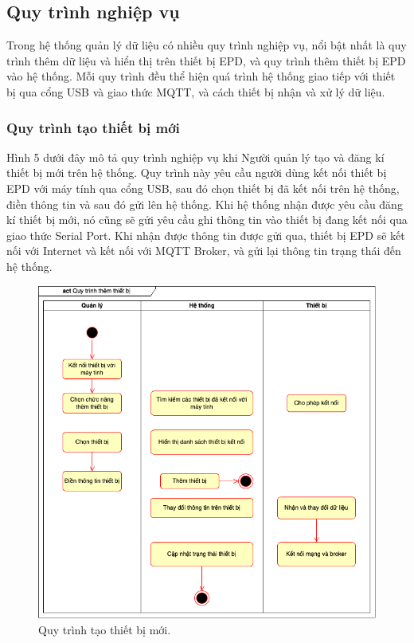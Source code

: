 \documentclass[../DoAn.tex]{subfiles}
\begin{document}
\subsection{Quy trình nghiệp vụ}
\label{subsection:2.2.3}
Trong hệ thống quản lý dữ liệu có nhiều quy trình nghiệp vụ, nổi bật nhất là quy trình thêm dữ liệu và hiển thị trên thiết bị EPD, và quy trình thêm thiết bị EPD vào hệ thống. Mỗi quy trình đều thể hiện quá trình hệ thống giao tiếp với thiết bị qua cổng USB và giao thức MQTT, và cách thiết bị nhận và xử lý dữ liệu.
\subsubsection{Quy trình tạo thiết bị mới}
Hình 5 dưới đây mô tả quy trình nghiệp vụ khi Người quản lý tạo và đăng kí thiết bị mới trên hệ thống. Quy trình này yêu cầu người dùng kết nối thiết bị EPD với máy tính qua cổng USB, sau đó chọn thiết bị đã kết nối trên hệ thống, điền thông tin và sau đó gửi lên hệ thống. Khi hệ thống nhận được yêu cầu đăng kí thiết bị mới, nó cũng sẽ gửi yêu cầu ghi thông tin vào thiết bị đang kết nối qua giao thức Serial Port. Khi nhận được thông tin được gửi qua, thiết bị EPD sẽ kết nối với Internet và kết nối với MQTT Broker, và gửi lại thông tin trạng thái đến hệ thống.
\begin{figure}[h]
    \centering
    \includegraphics[scale=0.6]{imgs/diagrams/act_addDevice.png}
    \caption{Quy trình tạo thiết bị mới.}
    \label{fig:uc-general}
\end{figure}
\end{document}
